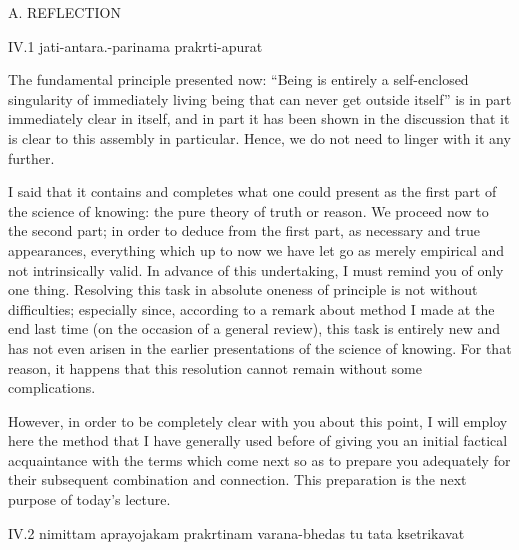 A. REFLECTION

IV.1
jati-antara.-parinama prakrti-apurat

The fundamental principle presented now:
“Being is entirely a self-enclosed singularity
of immediately living being
that can never get outside itself”
is in part immediately clear in itself,
and in part it has been shown in the discussion
that it is clear to this assembly in particular.
Hence, we do not need to linger with it any further.

I said that it contains and completes
what one could present as the first part
of the science of knowing:
the pure theory of truth or reason.
We proceed now to the second part;
in order to deduce from the first part,
as necessary and true appearances,
everything which up to now we have
let go as merely empirical
and not intrinsically valid.
In advance of this undertaking,
I must remind you of only one thing.
Resolving this task in absolute oneness
of principle is not without difficulties;
especially since, according to a remark about method
I made at the end last time
(on the occasion of a general review),
this task is entirely new
and has not even arisen in the earlier
presentations of the science of knowing.
For that reason, it happens that this resolution
cannot remain without some complications.

However, in order to be completely clear with you about this point,
I will employ here the method that I have generally used before
of giving you an initial factical acquaintance with the terms
which come next so as to prepare you adequately
for their subsequent combination and connection.
This preparation is the next purpose of today's lecture.

IV.2
nimittam aprayojakam prakrtinam varana-bhedas tu tata ksetrikavat

